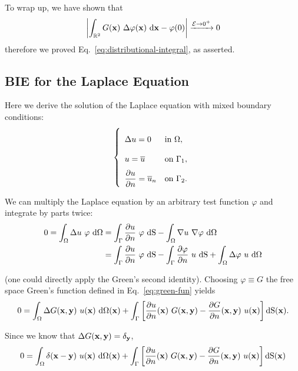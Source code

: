 \begin{demo}
To wrap up, we have shown that 
\begin{equation*}
\left| \int_{\mathbb{R}^2} G(\mathbf{x})\ \Delta\varphi(\mathbf{x})\  \mathrm{d} \mathbf{x}-\varphi(0) \right|\xrightarrow{\mathcal{E}\to0^+} 0
\end{equation*} 
therefore we proved Eq.~\eqref{eq:distributional-integral}, as asserted. 
\end{demo}


\subsection{BIE for the Laplace Equation}
\label{sub:BIE_for_the_laplace_equation}%

Here we derive the solution of the Laplace equation with mixed boundary conditions:
\begin{equation}
\label{eq:laplace-problem}
\left\{
{\renewcommand*{\arraystretch}{2}
\begin{array}{ll}
\Delta u=0 &\text{in }\Omega, \\
u=\overline{u} &\text{on }\Gamma_1, \\
\displaystyle\frac{\partial u}{\partial n}=\overline{u}_n &\text{on }\Gamma_2.
\end{array}}
\right.
\end{equation}

We can multiply the Laplace equation by an arbitrary test function $\varphi$ and integrate by parts twice:
\begin{align*}
0=\int_\Omega \Delta u\ \varphi \  \mathrm{d} \Omega&=\int_{\Gamma} \frac{\partial u}{\partial n}\ \varphi \  \mathrm{d} \mathrm{S}-\int_\Omega \nabla u\ \nabla \varphi\  \mathrm{d} \Omega \\ 
&=\int_{\Gamma} \frac{\partial u}{\partial n}\ \varphi \  \mathrm{d} \mathrm{S} - \int_{\Gamma} \frac{\partial \varphi}{\partial n}\ u \  \mathrm{d} \mathrm{S}+\int_\Omega \Delta \varphi\ u\  \mathrm{d} \Omega
\end{align*}

(one could directly apply the Green's second identity). Choosing $\varphi\equiv G$ the free space Green's function defined in Eq.~\eqref{eq:green-fun} yields
\begin{equation*}
0 = \int_\Omega \Delta G(\xv,\yv)\ u(\xv)\dom(\xv) + \int_{\Gamma} \left[ \frac{\partial u}{\partial n}(\xv)\ G(\xv,\yv) - \frac{\partial G}{\partial n}(\xv,\yv)\ u(\xv) \right]\!\! \dS(\xv).
\end{equation*}

Since we know that $\Delta G(\mathbf{x},\mathbf{y})=\delta_{\mathbf{y}}$,
\begin{equation*}
0 = \int_\Omega \delta(\mathbf{x}-\mathbf{y})\ u(\mathbf{x})\  \mathrm{d} \Omega(\mathbf{x}) + \int_{\Gamma} \left[ \frac{\partial u}{\partial n}(\mathbf{x})\ G(\mathbf{x},\mathbf{y}) - \frac{\partial G}{\partial n}(\mathbf{x},\mathbf{y})\ u(\mathbf{x}) \right]\!\! \  \mathrm{d} \mathrm{S}(\mathbf{x})
\end{equation*}

